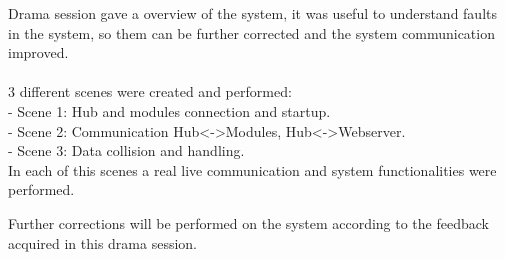 Drama session gave a overview of the system, it was useful to understand faults in the system, so them can be further corrected and the system communication improved.
\\
\\3 different scenes were created and performed:\\
- Scene 1: Hub and modules connection and startup.\\
- Scene 2: Communication Hub<->Modules, Hub<->Webserver.\\
- Scene 3: Data collision and handling.\\

In each of this scenes a real live communication and system functionalities were performed. 

Further corrections will be performed on the system according to the feedback acquired in this drama session.





